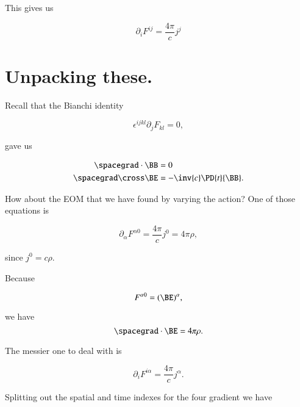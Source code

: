 This gives us

\begin{equation}\label{eqn:relativisticElectrodynamicsL13:210}
\boxed{
\partial_i F^{ij} = \frac{4 \pi}{c} j^j
}
\end{equation}

\section{Unpacking these.}

Recall that the Bianchi identity

\begin{equation}\label{eqn:relativisticElectrodynamicsL13:230}
\epsilon^{ijkl} \partial_j F_{kl} = 0,
\end{equation}

gave us

\begin{align}\label{eqn:relativisticElectrodynamicsL13:250}
\spacegrad \cdot \BB &= 0 \\
\spacegrad \cross \BE &= -\inv{c} \PD{t}{\BB}.
\end{align}

How about the EOM that we have found by varying the action?  One of those equations is

\begin{equation}\label{eqn:relativisticElectrodynamicsL13:270}
\partial_\alpha F^{\alpha 0} = \frac{4 \pi}{c} j^0 = 4 \pi \rho,
\end{equation}

since $j^0 = c \rho$.

Because

\begin{equation}\label{eqn:relativisticElectrodynamicsL13:290}
F^{\alpha 0} = (\BE)^\alpha,
\end{equation}

we have
\begin{equation}\label{eqn:relativisticElectrodynamicsL13:310}
\spacegrad \cdot \BE = 4 \pi \rho.
\end{equation}

The messier one to deal with is

\begin{equation}\label{eqn:relativisticElectrodynamicsL13:330}
\partial_i F^{i\alpha} = \frac{4 \pi}{c} j^\alpha.
\end{equation}

Splitting out the spatial and time indexes for the four gradient we have

